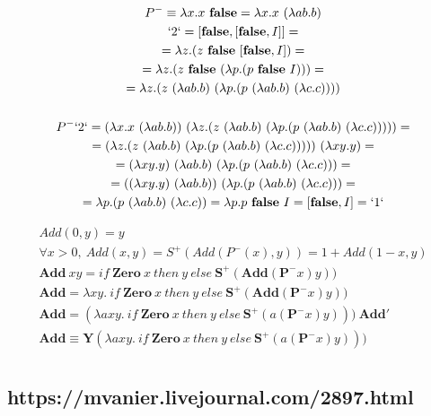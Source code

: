 \documentclass[11pt]{article}
\begin{document}
\begin{gather*}
P^- \equiv \lambda x.x\ \mathbf{false} = \lambda x.x\ (\lambda ab.b) \\
`2` = [\mathbf{false}, [\mathbf{false}, I]] = \\
= \lambda z.(z\ \mathbf{false}\ [\mathbf{false}, I]) = \\
= \lambda z.(z\ \mathbf{false}\ (\lambda p.(p\ \mathbf{false}\ I))) = \\
= \lambda z.(z\ (\lambda ab.b)\ (\lambda p.(p\ (\lambda ab.b)\ (\lambda c.c)))) \\ 
\\
P^- `2`  = (\lambda x.x\ (\lambda ab.b))\ (\lambda z.(z\ (\lambda ab.b)\ (\lambda p.(p\ (\lambda ab.b)\ (\lambda c.c))))) = \\
= (\lambda z.(z\ (\lambda ab.b)\ (\lambda p.(p\ (\lambda ab.b)\ (\lambda c.c)))))\ (\lambda xy.y) = \\
= (\lambda xy.y)\ (\lambda ab.b)\ (\lambda p.(p\ (\lambda ab.b)\ (\lambda c.c))) = \\
= ((\lambda xy.y)\ (\lambda ab.b))\ (\lambda p.(p\ (\lambda ab.b)\ (\lambda c.c))) = \\
= \lambda p.(p\ (\lambda ab.b)\ (\lambda c.c)) = \lambda p. p\ \mathbf{false}\ I = [\mathbf{false}, I] = `1`
\end{gather*}


\begin{gather*}
Add (0, y) = y \\
\forall x > 0,\ Add(x, y) = S^+ (Add (P^- (x), y)) = 1+ Add (1-x, y)\\
\mathbf{Add}\ xy = if\ \mathbf{Zero}\ x\ then\ y\ else\ \mathbf{S^+}(\mathbf{Add} (\mathbf{P^-}x)y)) \\
\mathbf{Add} = \lambda xy.\ if\ \mathbf{Zero}\ x\ then\ y\ else\ \mathbf{S^+}(\mathbf{Add} (\mathbf{P^-}x)y)) \\
\mathbf{Add} = (\lambda axy.\ if\ \mathbf{Zero}\ x\ then\ y\ else\ \mathbf{S^+}(a (\mathbf{P^-}x)y)))\ \mathbf{Add'} \\
\mathbf{Add} \equiv \mathbf{Y} (\lambda axy.\ if\ \mathbf{Zero}\ x\ then\ y\ else\ \mathbf{S^+}(a (\mathbf{P^-}x)y))) \\
\end{gather*}

\clearpage
\subsection*{https://mvanier.livejournal.com/2897.html}
\end{document}
